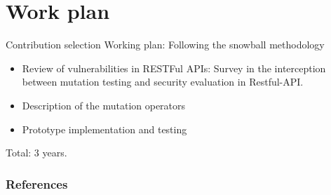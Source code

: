 \documentclass[10pt]{beamer}
\theoremstyle{remark}
\theoremstyle{definition}
\begin{document}
\section{Work plan}

\begin{frame}{Contribution selection}
Working plan: Following the snowball methodology
\begin{itemize}
    \item Review of vulnerabilities in RESTFul APIs: Survey in the interception between mutation testing and security evaluation in Restful-API.
    \item Description of the mutation operators
    \item Prototype implementation and testing
\end{itemize}
Total: 3 years.
\end{frame}


\begin{frame}[allowframebreaks]
\frametitle{References}
\end{frame}
\end{document}
